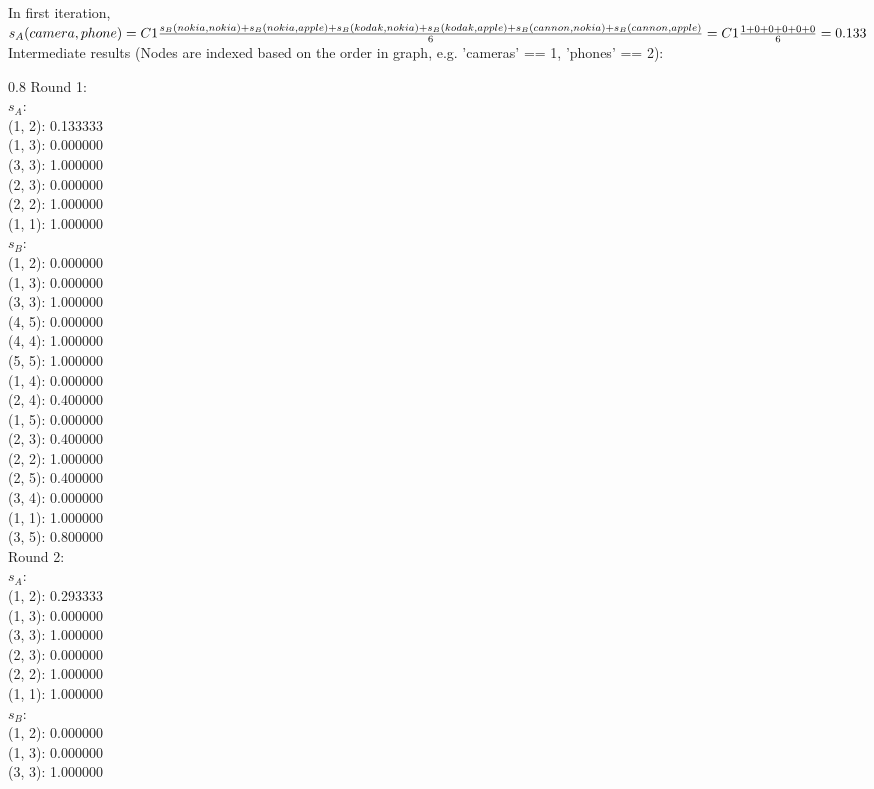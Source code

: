 \documentclass{article}
\newenvironment{myenv}[1]
  {\begin{spacing}{#1}}
  {\end{spacing}}
\begin{document}
In first iteration, $s_A(camera, phone) = \\ C1\frac{s_B(nokia, nokia) +  s_B(nokia, apple) + s_B(kodak, nokia) + s_B(kodak, apple) + s_B(cannon, nokia) + s_B(cannon, apple)}{6} = \\ C1\frac{1 + 0 + 0 + 0 + 0 + 0}{6} = 0.133$ \\
Intermediate results (Nodes are indexed based on the order in graph, e.g. 'cameras' == 1, 'phones' == 2): \\
\begin{myenv}{0.8}
Round 1:\\ 
$s_A$:\\
(1, 2): 0.133333 \\
(1, 3): 0.000000 \\
(3, 3): 1.000000 \\
(2, 3): 0.000000 \\
(2, 2): 1.000000 \\
(1, 1): 1.000000 \\
$s_B$:\\
(1, 2): 0.000000 \\
(1, 3): 0.000000 \\
(3, 3): 1.000000 \\
(4, 5): 0.000000 \\
(4, 4): 1.000000 \\
(5, 5): 1.000000 \\
(1, 4): 0.000000 \\
(2, 4): 0.400000 \\
(1, 5): 0.000000 \\
(2, 3): 0.400000 \\
(2, 2): 1.000000 \\
(2, 5): 0.400000 \\
(3, 4): 0.000000 \\
(1, 1): 1.000000 \\
(3, 5): 0.800000 \\
Round 2:\\ 
$s_A$:\\
(1, 2): 0.293333 \\
(1, 3): 0.000000 \\
(3, 3): 1.000000 \\
(2, 3): 0.000000 \\
(2, 2): 1.000000 \\
(1, 1): 1.000000 \\
$s_B$:\\
(1, 2): 0.000000 \\
(1, 3): 0.000000 \\
(3, 3): 1.000000 \\

\end{myenv}
\end{document}
